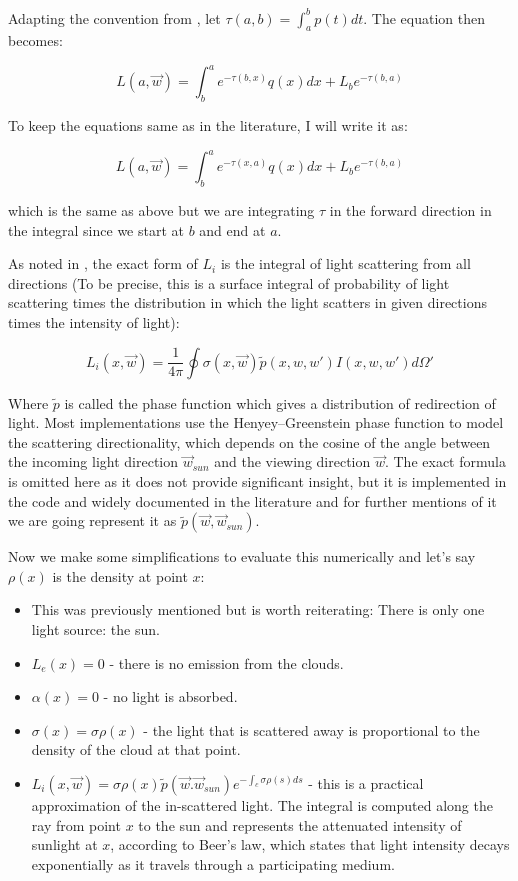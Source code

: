 Adapting the convention from \cite{palenik2016volumetricclouds}, let $\tau(a, b) = \int_a^b{p(t)dt}$. The equation then becomes: 

\[
L(a, \vec{w}) = \int_b^{a}{e^{-\tau(b, x)}q(x)dx} + L_be^{-\tau(b, a)}
\]

To keep the equations same as in the literature, I will write it as:

\begin{equation}\label{eq:light}
L(a, \vec{w}) = \int_b^{a}{e^{-\tau(x, a)}q(x)dx} + L_be^{-\tau(b, a)}
\end{equation}

which is the same as above but we are integrating $\tau$ in the forward direction in the integral since we start at $b$ and end at $a$.

As noted in \cite{palenik2016volumetricclouds}, the exact form of $L_i$ is the integral of light scattering from all directions (To be precise, this is a surface integral of probability of light scattering times the distribution in which the light scatters in given directions times the intensity of light): 

\[
    L_i(x, \vec{w}) = \frac{1}{4\pi}\oint\sigma(x, \vec{w})\tilde{p}(x, w, w')I(x, w, w')d\Omega'
\]

Where $\tilde{p}$ is called the phase function which gives a distribution of redirection of light. Most implementations use the Henyey–Greenstein phase function to model the scattering directionality, which depends on the cosine of the angle between the incoming light direction $\vec{w}_{sun}$ and the viewing direction $\vec{w}$. The exact formula is omitted here as it does not provide significant insight, but it is implemented in the code and widely documented in the literature and for further mentions of it we are going represent it as $\tilde{p}(\vec{w}, \vec{w}_{sun})$.

Now we make some simplifications to evaluate this numerically and let's say $\rho(x)$ is the density at point $x$: \cite{palenik2016volumetricclouds}
\begin{itemize}
\item {This was previously mentioned but is worth reiterating: There is only one light source: the sun.}
\item {$L_e(x) = 0$ - there is no emission from the clouds.}
\item {$\alpha(x) = 0$ - no light is absorbed.}
\item {$\sigma(x) = \sigma\rho(x)$} - the light that is scattered away is proportional to the density of the cloud at that point.
\item {$L_i(x, \vec{w}) = \sigma\rho(x)\tilde{p}(\vec{w}.\vec{w}_{sun})e^{-\int_c{\sigma\rho(s)ds}}$} - this is a practical approximation of the in-scattered light. The integral is computed along the ray from point $x$ to the sun and represents the attenuated intensity of sunlight at $x$, according to Beer's law, which states that light intensity decays exponentially as it travels through a participating medium. 
\end{itemize}

